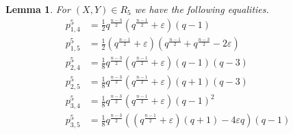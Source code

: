 \documentclass[a4paper]{article}
\newtheorem{lm}[thm]{Lemma}
\theoremstyle{definition}
\newcommand{\eps}{\varepsilon}
\begin{document}
\begin{lm}
    For $(X,Y)\in R_{5}$ we have the following equalities.
    \begin{align*}
        p^{5}_{1,4}&=\frac{1}{2}q^{\frac{n-3}{2}}\left(q^{\frac{n-1}{2}}+\eps \right)\left(q-1\right)\\
        p^{5}_{1,5}&=\frac{1}{2}\left(q^{\frac{n-1}{2}}+\eps\right)\left(q^{\frac{n-1}{2}}+q^{\frac{n-3}{2}}-2\eps\right)\\
        p^{5}_{2,4}&=\frac{1}{8}q^{\frac{n-3}{2}}\left(q^{\frac{n-1}{2}}+\eps \right)\left(q-1\right)\left(q-3\right)\\
        p^{5}_{2,5}&=\frac{1}{8}q^{\frac{n-3}{2}}\left(q^{\frac{n-1}{2}}+\eps \right)(q+1)(q-3)\\
        p^{5}_{3,4}&=\frac{1}{8}q^{\frac{n-3}{2}}\left(q^{\frac{n-1}{2}}+\eps \right)\left(q-1\right)^2\\
        p^{5}_{3,5}&=\frac{1}{8}q^{\frac{n-3}{2}}\left(\left( q^{\frac{n-1}2}+\eps\right)(q+1) - 4\eps q \right)\left(q-1\right)
    \end{align*}
\end{lm}
\end{document}
